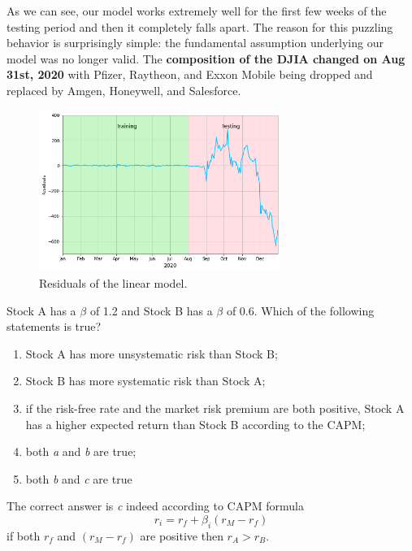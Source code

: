 \begin{solution}
As we can see, our model works extremely well for the first few weeks of the testing period and then it completely falls apart. The reason for this puzzling behavior is surprisingly simple: the fundamental assumption underlying our model was no longer valid. The \textbf{composition of the DJIA changed on Aug 31st, 2020} with Pfizer, Raytheon, and Exxon Mobile being dropped and replaced by Amgen, Honeywell, and Salesforce.

\begin{figure}[htbp]
\centering
\includegraphics[width=0.7\textwidth]{figures/residuals}
\caption{Residuals of the linear model.}
\label{fig:residuals}
\end{figure}
\end{solution}

\begin{question}
Stock A has a $\beta$ of 1.2 and Stock B has a $\beta$ of 0.6. Which of the following statements is true? 
\begin{enumerate}[label=\emph{\alph*})]
\tightlist
\item Stock A has more unsystematic risk than Stock B;
\item Stock B has more systematic risk than Stock A; 
\item if the risk-free rate and the market risk premium are both positive, Stock A has a higher expected return than Stock B according to the CAPM;
\item both \emph{a} and \emph{b} are true;
\item both \emph{b} and \emph{c} are true
\end{enumerate}
\end{question}

\begin{solution}
The correct answer is \emph{c} indeed according to CAPM formula
\[r_i = r_f + \beta_i (r_M - r_f)\]
if both $r_f$ and $(r_M - r_f)$ are positive then $r_A > r_B$.
\end{solution}	

